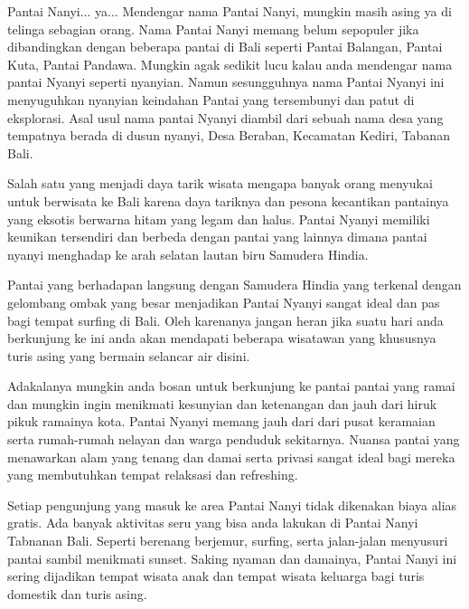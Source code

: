 \documentclass[A4,12pt]{texMemo} %
\begin{document}
\maketitle %


Pantai Nanyi... ya... Mendengar nama Pantai Nanyi, mungkin masih asing ya di telinga sebagian orang. Nama Pantai Nanyi memang belum sepopuler jika dibandingkan dengan beberapa pantai di Bali seperti Pantai Balangan, Pantai Kuta, Pantai Pandawa. Mungkin agak sedikit lucu kalau anda mendengar nama pantai Nyanyi seperti nyanyian. Namun sesungguhnya nama Pantai Nyanyi ini menyuguhkan nyanyian keindahan Pantai yang tersembunyi dan patut di eksplorasi. Asal usul nama pantai Nyanyi diambil dari sebuah nama desa yang tempatnya berada di dusun nyanyi, Desa Beraban, Kecamatan Kediri, Tabanan Bali. 

Salah satu yang menjadi daya tarik wisata mengapa banyak orang menyukai untuk berwisata ke Bali karena daya tariknya dan pesona kecantikan pantainya yang eksotis berwarna hitam yang legam dan halus. Pantai Nyanyi memiliki keunikan tersendiri dan berbeda dengan pantai yang lainnya dimana pantai nyanyi menghadap ke arah selatan lautan biru Samudera Hindia. 

Pantai yang berhadapan langsung dengan Samudera Hindia yang terkenal dengan gelombang ombak yang besar menjadikan Pantai Nyanyi sangat ideal dan pas bagi tempat surfing di Bali. Oleh karenanya jangan heran jika suatu hari anda berkunjung ke ini anda akan mendapati beberapa wisatawan yang khususnya turis asing yang bermain selancar air disini.

Adakalanya mungkin anda bosan untuk berkunjung ke pantai pantai yang ramai dan mungkin ingin menikmati kesunyian dan ketenangan dan jauh dari hiruk pikuk ramainya kota. Pantai Nyanyi memang jauh dari dari pusat keramaian serta rumah-rumah nelayan dan warga penduduk sekitarnya. Nuansa pantai yang menawarkan alam yang tenang dan damai serta privasi sangat ideal bagi mereka yang membutuhkan tempat relaksasi dan refreshing. 

Setiap pengunjung yang masuk ke area Pantai Nanyi tidak dikenakan biaya alias gratis. Ada banyak aktivitas seru yang bisa anda lakukan di Pantai Nanyi Tabnanan Bali. Seperti berenang berjemur, surfing, serta jalan-jalan menyusuri pantai sambil menikmati sunset. Saking nyaman dan damainya, Pantai Nanyi ini sering dijadikan tempat wisata anak dan tempat wisata keluarga bagi turis domestik dan turis asing. 

\end{document}
